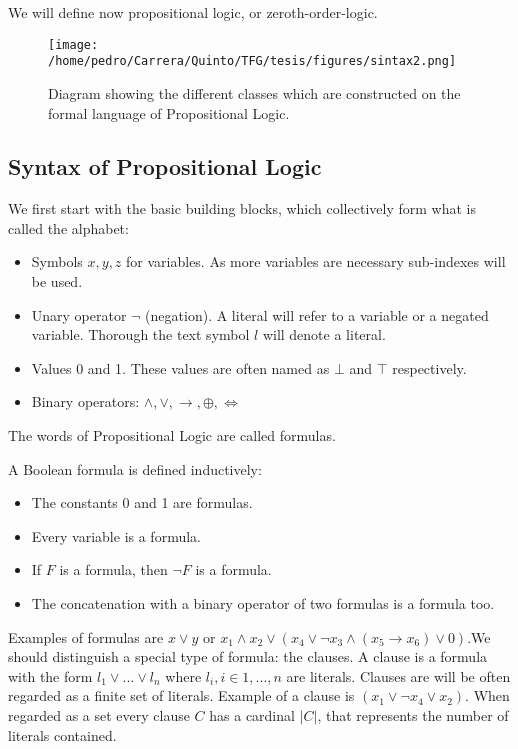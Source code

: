 We will define now propositional logic, or zeroth-order-logic. \\

\begin{figure}[h]
  \begin{center}
    \texttt{[image: /home/pedro/Carrera/Quinto/TFG/tesis/figures/sintax2.png]}
    \caption{Diagram showing the different classes which are constructed on the formal language of Propositional Logic.}
  \end{center}
\end{figure} 

\subsection{Syntax of Propositional Logic}
We first start with the basic building blocks, which collectively form what is called the alphabet:
\begin{itemize}
\item Symbols $x,y,z$ for variables. As more variables are necessary sub-indexes will be used.
\item Unary operator $\neg$ (negation). A literal will refer to a variable or a negated variable. Thorough the text symbol $l$ will denote a literal. 
  
\item Values 0 and 1. These values are often named as $\bot$ and $\top$ respectively.

\item Binary operators: $\wedge, \vee, \rightarrow, \oplus, \iff $
\end{itemize}


The words of Propositional Logic are called formulas.
\begin{definition}
  A Boolean formula is defined inductively:
  \begin{itemize}
  \item The constants 0 and 1 are formulas.
  \item Every variable is a formula.
  \item If $F$ is a formula, then $\neg  F$ is a formula.
  \item The concatenation with a binary operator of two formulas is a formula too.\\
  \end{itemize}
\end{definition}

Examples of formulas are $x\vee y$ or $x_1\wedge x_2 \vee  ( x_4 \vee \neg  x_3 \wedge (x_5\to x_6) \vee 0 )$.We should distinguish a special type of formula: the clauses. A clause  is a formula with the form $l_1\vee ... \vee l_n$ where $l_i, i \in 1,...,n$ are literals. Clauses are will be often regarded as a finite set of literals. Example of a clause is $(x_1\vee \neg x_4 \vee x_2)$. When regarded as a set every clause $C$ has a cardinal $|C|$, that represents the number of literals contained. \\


